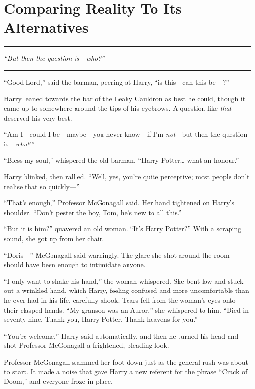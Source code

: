 \chapter{Comparing Reality To Its Alternatives}

\begin{center}\rule{3in}{0.4pt}\end{center}

\emph{``But then the question is---who?''}

\begin{center}\rule{3in}{0.4pt}\end{center}

``Good Lord,'' said the barman, peering at Harry, ``is this---can this
be---?''

Harry leaned towards the bar of the Leaky Cauldron as best he could,
though it came up to somewhere around the tips of his eyebrows. A
question like \emph{that} deserved his very best.

``Am I---could I be---maybe---you never know---if I'm \emph{not}---but
then the question is---\emph{who?''}

``Bless my soul,'' whispered the old barman. ``Harry Potter\ldots{} what
an honour.''

Harry blinked, then rallied. ``Well, yes, you're quite perceptive; most
people don't realise that so quickly---''

``That's enough,'' Professor McGonagall said. Her hand tightened on
Harry's shoulder. ``Don't pester the boy, Tom, he's new to all this.''

``But it is him?'' quavered an old woman. ``It's Harry Potter?'' With a
scraping sound, she got up from her chair.

``Doris---'' McGonagall said warningly. The glare she shot around the
room should have been enough to intimidate anyone.

``I only want to shake his hand,'' the woman whispered. She bent low and
stuck out a wrinkled hand, which Harry, feeling confused and more
uncomfortable than he ever had in his life, carefully shook. Tears fell
from the woman's eyes onto their clasped hands. ``My granson was an
Auror,'' she whispered to him. ``Died in seventy-nine. Thank you, Harry
Potter. Thank heavens for you.''

``You're welcome,'' Harry said automatically, and then he turned his
head and shot Professor McGonagall a frightened, pleading look.

Professor McGonagall slammed her foot down just as the general rush was
about to start. It made a noise that gave Harry a new referent for the
phrase ``Crack of Doom,'' and everyone froze in place.

